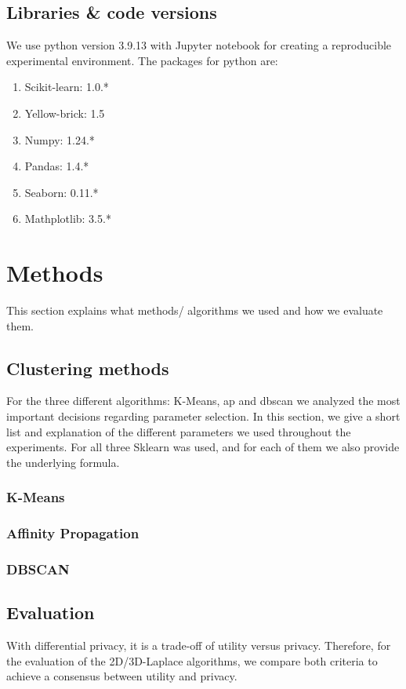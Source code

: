 \subsection{Libraries \& code versions}
We use python version 3.9.13 with Jupyter notebook for creating a reproducible experimental environment.
The packages for python are:
\begin{enumerate}
  \item Scikit-learn: 1.0.*
  \item Yellow-brick: 1.5
  \item Numpy: 1.24.*
  \item Pandas: 1.4.*
  \item Seaborn: 0.11.*
  \item Mathplotlib: 3.5.*
\end{enumerate}

\section{Methods}
This section explains what methods/ algorithms we used and how we evaluate them.
\subsection{Clustering methods}
For the three different algorithms: K-Means, \gls{ap} and \gls{dbscan} we analyzed the most important decisions regarding parameter selection.
In this section, we give a short list and explanation of the different parameters we used throughout the experiments.
For all three Sklearn was used, and for each of them we also provide the underlying formula.
\subsubsection{K-Means}
\subsubsection{Affinity Propagation}
\subsubsection{DBSCAN}

\subsection{Evaluation}
With differential privacy, it is a trade-off of utility versus privacy.
Therefore, for the evaluation of the 2D/3D-Laplace algorithms, we compare both criteria to achieve a consensus between utility and privacy.
